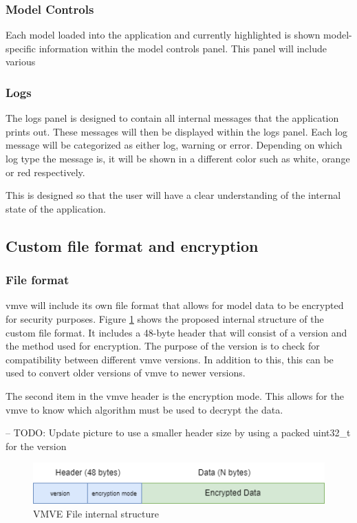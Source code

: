 \documentclass[11pt]{article}
\begin{document}
\subsubsection{Model Controls}

Each model loaded into the application and currently highlighted is shown
model-specific information within the model controls panel. This panel will include various 


\subsubsection{Logs}
The logs panel is designed to contain all internal messages that the application
prints out. These messages will then be displayed within the logs panel. Each
log message will be categorized as either log, warning or error. Depending on
which log type the message is, it will be shown in a different color such as
white, orange or red respectively.

This is designed so that the user will have a clear understanding of the internal state
of the application.

\subsection{Custom file format and encryption}

\subsubsection{File format}
\gls{vmve} will include its own file format that allows for model data to be encrypted for security purposes.
Figure \ref{fig:vmve_file_structure} shows the proposed internal structure of the custom file format.
It includes a 48-byte header that will consist of a version and the method used for encryption.
The purpose of the version is to check for compatibility between different \gls{vmve} versions. In addition to this,
this can be used to convert older versions of \gls{vmve} to newer versions.

The second item in the \gls{vmve} header is the encryption mode. This allows for the \gls{vmve} to know which algorithm
must be used to decrypt the data.

-- TODO: Update picture to use a smaller header size by using a packed uint32\_t for the version

\begin{figure}[ht]
  \centering
  \includegraphics[width=\textwidth]{images/vmve_file_structure.png}
  \caption{VMVE File internal structure}
  \label{fig:vmve_file_structure}
\end{figure}
\end{document}
